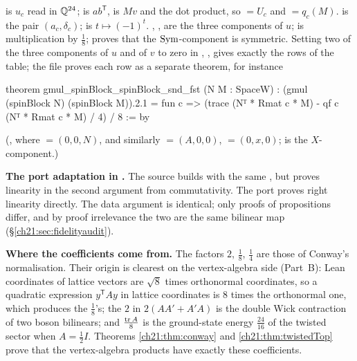 \begin{dictionary}
 is $u_c$ read in ${\mathbb{Q}}^{24}$;  is $ab^{\mathsf T}$,  is $Mv$
and  the dot product, so  $=U_c$ and  $=q_c(M)$.   is the
pair $(a_c,\delta_c)$;  is $t\mapsto(-1)^t$.  , , 
are the three components of $u$;  is multiplication by $\frac18$; 
proves that the $\mathrm{Sym}$-component is symmetric.  Setting two of the three components of $u$ and of
$v$ to zero in , ,  gives exactly the rows of the table; the file
 proves each row as a separate theorem, for instance
\end{dictionary}
\begin{leancode}
theorem gmul_spinBlock_spinBlock_snd_fst (N M : SpaceW) :
    (gmul (spinBlock N) (spinBlock M)).2.1
      = fun c => (trace (Nᵀ * Rmat c * M) - qf c (Nᵀ * Rmat c * M) / 4) / 8 := by
\end{leancode}
(, where
 $=(0,0,N)$, and similarly  $=(A,0,0)$,  $=(0,x,0)$;
 is the $X$-component.)
\begin{dictionary}
\textbf{The port adaptation in .}  The source builds  with the same
, but proves linearity in the second argument from commutativity.  The
port proves right linearity directly.  The data argument  is identical; only proofs of
propositions differ, and by proof irrelevance the two  are the same bilinear map
(\S\ref{ch21:sec:fidelityaudit}).

\textbf{Where the coefficients come from.}  The factors $2$, $\frac18$, $\frac14$ are those of Conway's
normalisation.  Their origin is clearest on the vertex-algebra side (Part~B): Lean coordinates of lattice
vectors are $\sqrt8$ times orthonormal coordinates, so a quadratic expression $y^{\mathsf T}Ay$ in
lattice coordinates is $8$ times the orthonormal one, which produces the $\frac18$'s; the $2$ in
$2(AA'+A'A)$ is the double Wick contraction of two boson bilinears; and $\frac{\operatorname{tr} A}8$ is the
ground-state energy $\tfrac{24}{16}$ of the twisted sector when $A=\tfrac12I$.  Theorems
\ref{ch21:thm:conway} and \ref{ch21:thm:twistedTop} prove that the vertex-algebra products have exactly
these coefficients.
\end{dictionary}


